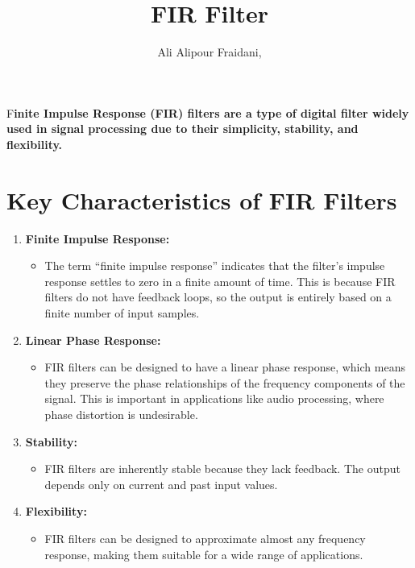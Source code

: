 \documentclass[paper=a4, fontsize=11pt, onecolumn]{scrartcl}	 %
\title{FIR Filter} %
\author{Ali Alipour Fraidani, } %
\date{} %
\newcommand{\initial}[1]{ %
\lettrine[lines=3,lhang=0.3,nindent=0em]{
\color{DarkGoldenrod}
{\textsf{#1}}}{}}
\begin{document}
\maketitle %

\thispagestyle{fancy} %


\initial{F}\textbf{inite Impulse Response (FIR) filters are a type of digital filter widely used in signal processing due to their simplicity, stability, and flexibility.}


\section*{Key Characteristics of FIR Filters}

\begin{enumerate}
    \item \textbf{Finite Impulse Response:}
    \begin{itemize}
        \item The term ``finite impulse response'' indicates that the filter's impulse response settles to zero in a finite amount of time. This is because FIR filters do not have feedback loops, so the output is entirely based on a finite number of input samples.
    \end{itemize}

    \item \textbf{Linear Phase Response:}
    \begin{itemize}
        \item FIR filters can be designed to have a linear phase response, which means they preserve the phase relationships of the frequency components of the signal. This is important in applications like audio processing, where phase distortion is undesirable.
    \end{itemize}

    \item \textbf{Stability:}
    \begin{itemize}
        \item FIR filters are inherently stable because they lack feedback. The output depends only on current and past input values.
    \end{itemize}

    \item \textbf{Flexibility:}
    \begin{itemize}
        \item FIR filters can be designed to approximate almost any frequency response, making them suitable for a wide range of applications.
    \end{itemize}
\end{enumerate}
\end{document}
